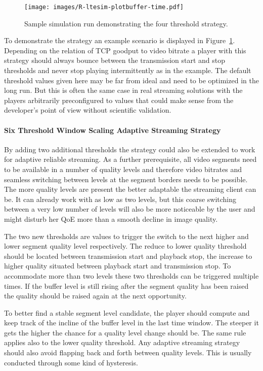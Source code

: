 \begin{figure}[htb]
	\centering
	\texttt{[image: images/R-ltesim-plotbuffer-time.pdf]}
	\caption{Sample simulation run demonstrating the four threshold strategy.}
\label{c6:fig:ltesim-plotbuffer-time}
\end{figure}

To demonstrate the strategy an example scenario is displayed in Figure~\ref{c6:fig:ltesim-plotbuffer-time}. Depending on the relation of \gls{TCP} goodput to video bitrate a player with this strategy should always bounce between the transmission start and stop thresholds and never stop playing intermittently as in the example. The default threshold values given here may be far from ideal and need to be optimized in the long run. But this is often the same case in real streaming solutions with the players arbitrarily preconfigured to values that could make sense from the developer's point of view without scientific validation.


\paragraph{Six Threshold Window Scaling Adaptive Streaming Strategy}

By adding two additional thresholds the strategy could also be extended to work for adaptive reliable streaming. As a further prerequisite, all video segments need to be available in a number of quality levels and therefore video bitrates and seamless switching between levels at the segment borders needs to be possible. The more quality levels are present the better adaptable the streaming client can be. It can already work with as low as two levels, but this coarse switching between a very low number of levels will also be more noticeable by the user and might disturb her \gls{QoE} more than a smooth decline in image quality.

The two new thresholds are values to trigger the switch to the next higher and lower segment quality level respectively. The reduce to lower quality threshold should be located between transmission start and playback stop, the increase to higher quality situated between playback start and transmission stop. To accommodate more than two levels these two thresholds can be triggered multiple times. If the buffer level is still rising after the segment quality has been raised the quality should be raised again at the next opportunity.

To better find a stable segment level candidate, the player should compute and keep track of the incline of the buffer level in the last time window. The steeper it gets the higher the chance for a quality level change should be. The same rule applies also to the lower quality threshold. Any adaptive streaming strategy should also avoid flapping back and forth between quality levels. This is usually conducted through some kind of hysteresis.

